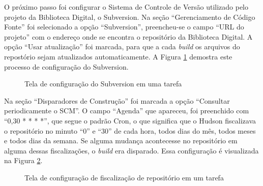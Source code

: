 O próximo passo foi configurar o Sistema de Controle de Versão utilizado pelo projeto da Biblioteca Digital, o Subversion. Na seção ``Gerenciamento de Código Fonte'' foi selecionado a opção ``Subversion'', preencheu-se o campo ``URL do projeto'' com o endereço onde se encontra o repositório da Biblioteca Digital. A opção ``Usar atualização'' foi marcada, para que a cada \textit{build} os arquivos do repostório sejam atualizados automaticamente. A Figura \ref{configuracao_tarefa_subversion} demostra este processo de configuração do Subversion.

\begin{figure}[ht]
    \centering
    \caption{Tela de configuração do Subversion em uma tarefa}
    \label{configuracao_tarefa_subversion}
\end{figure}

Na seção ``Disparadores de Construção'' foi marcada a opção ``Consultar periodicamente o SCM''. O campo ``Agenda'' que apareceu, foi preenchido com ``0,30 * * * *'', que segue o padrão Cron, o que significa que o Hudson fiscalizava o repositório no minuto ``0'' e ``30'' de cada hora, todos dias do mês, todos meses e todos dias da semana. Se alguma mudança acontecesse no repositório em alguma dessas fiscalizações, o \textit{build} era disparado. Essa configuração é visualizada na Figura \ref{configuracao_tarefa_consulta}.

\begin{figure}[ht]
    \centering
    \caption{Tela de configuração de fiscalização de repositório em um tarefa}
    \label{configuracao_tarefa_consulta}
\end{figure}


